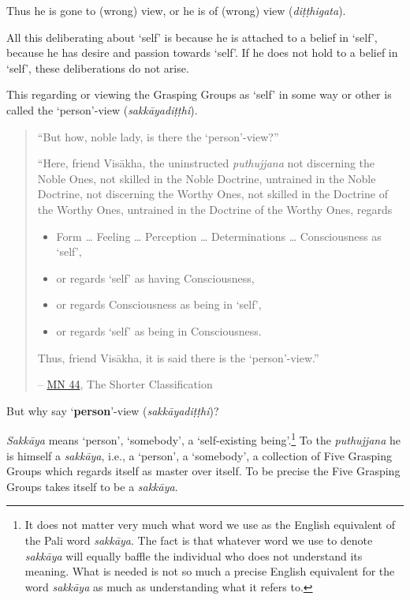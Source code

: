 Thus he is gone to (wrong) view, or he is of (wrong) view (\emph{diṭṭhigata}).

All this deliberating about `self' is because he is attached to a belief in `self', because he has desire and passion towards `self'. If he does not hold to a belief in `self', these deliberations do not arise.

This regarding or viewing the Grasping Groups as `self' in some way or other is called the `person'-view (\emph{sakkāyadiṭṭhi}).

\begin{quote}
``But how, noble lady, is there the `person'-view?''

``Here, friend Visākha, the uninstructed \emph{puthujjana} not discerning the Noble Ones, not skilled in the Noble Doctrine, untrained in the Noble Doctrine, not discerning the Worthy Ones, not skilled in the Doctrine of the Worthy Ones, untrained in the Doctrine of the Worthy Ones, regards

\begin{itemize}
\item
  Form \ldots{} Feeling \ldots{} Perception \ldots{} Determinations \ldots{} Consciousness as `self',
\item
  or regards `self' as having Consciousness,
\item
  or regards Consciousness as being in `self',
\item
  or regards `self' as being in Consciousness.
\end{itemize}

Thus, friend Visākha, it is said there is the `person'-view.''

 -- \href{https://suttacentral.net/mn44/en/sujato}{MN 44}, The Shorter Classification
\end{quote}

But why say `\textbf{person}'-view (\emph{sakkāyadiṭṭhi})?

\emph{Sakkāya} means `person', `somebody', a `self-existing being'.\footnote{It does not matter very much what word we use as the English equivalent of the Pali word \emph{sakkāya}. The fact is that whatever word we use to denote \emph{sakkāya} will equally baffle the individual who does not understand its meaning. What is needed is not so much a precise English equivalent for the word \emph{sakkāya} as much as understanding what it refers to.} To the \emph{puthujjana} he is himself a \emph{sakkāya}, i.e., a `person', a `somebody', a collection of Five Grasping Groups which regards itself as master over itself. To be precise the Five Grasping Groups takes itself to be a \emph{sakkāya}.

